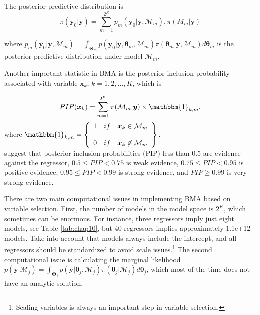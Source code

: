 The posterior predictive distribution is
\begin{equation*}
	\pi(\bm{y}_0|\bm{y})= \sum_{m=1}^{2^K}p_m(\bm{y}_0|\bm{y},\mathcal{M}_m), \pi(M_m|\bm{y})
\end{equation*}

where $p_m(\bm{y}_0|\bm{y},\mathcal{M}_m)=\int_{\bm{\Theta}_m} p(\bm{y}_0|\bm{y},\bm{\theta}_m,\mathcal{M}_m)\pi(\bm{\theta}_m |\bm{y}, \mathcal{M}_m) d\bm{\theta}_{m}$ is the posterior predictive distribution under model $\mathcal{M}_m$. 

Another important statistic in BMA is the posterior inclusion probability associated with variable $\bm{x}_k$, $k=1,2,\dots,K$, which is

\begin{equation*}
	PIP(\bm{x}_k)=\sum_{m=1}^{2^K}\pi(\mathcal{M}_m|\bm{y})\times \mathbbm{1}_{k,m},
\end{equation*}
where
$\mathbbm{1}_{k,m}= \left\{ \begin{array}{lcc}
	1&   if  & \bm{x}_{k}\in \mathcal{M}_m \\
	\\ 0 &  if & \bm{x}_{k}\not \in \mathcal{M}_m
\end{array}
\right\}.$\\

\cite{Kass1995} suggest that posterior inclusion probabilities (PIP) less than 0.5 are evidence against the regressor, $0.5\leq PIP<0.75$ is weak evidence, $0.75\leq PIP<0.95$ is positive evidence, $0.95\leq PIP<0.99$ is strong evidence, and $PIP\geq 0.99$ is very strong evidence.

There are two main computational issues in implementing BMA based on variable selection. First, the number of models in the model space is $2^K$, which sometimes can be enormous. For instance, three regressors imply just eight models, see Table \ref{tab:chap10}, but 40 regressors implies approximately  1.1e+12 models. Take into account that models always include the intercept, and all regressors should be standardized to avoid scale issues.\footnote{Scaling variables is always an important step in variable selection.} The second computational issue is calculating the marginal likelihood $p(\bm{y} | \mathcal{M}_j)=\int_{\bm{\Theta}_j} p(\bm{y}| \bm{\theta}_j,\mathcal{M}_j)\pi(\bm{\theta}_j | \mathcal{M}_j) d\bm{\theta}_{j}$, which most of the time does not have an analytic solution. 

